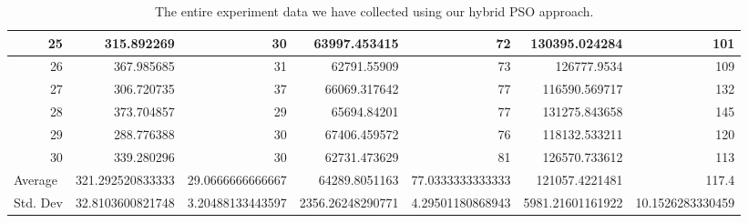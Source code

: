 \begin{table}
\begin{adjustwidth}{}{}
{{\begin{tabular}{|r|r|r|r|r|r|r|}
\hline
25                                         & 315.892269                   & 30                                    & 63997.453415                   & 72                                    & 130395.024284                & 101                                    \\ 
\hline
26                                         & 367.985685                   & 31                                    & 62791.55909                    & 73                                    & 126777.9534                  & 109                                    \\ 
\hline
27                                         & 306.720735                   & 37                                    & 66069.317642                   & 77                                    & 116590.569717                & 132                                    \\ 
\hline
28                                         & 373.704857                   & 29                                    & 65694.84201                    & 77                                    & 131275.843658                & 145                                    \\ 
\hline
29                                         & 288.776388                   & 30                                    & 67406.459572                   & 76                                    & 118132.533211                & 120                                    \\ 
\hline
30                                         & 339.280296                   & 30                                    & 62731.473629                   & 81                                    & 126570.733612                & 113                                    \\ 
\hline
\multicolumn{1}{|l|}{Average}              & 321.292520833333             & 29.0666666666667                      & 64289.8051163                  & 77.0333333333333                      & 121057.4221481               & 117.4                                  \\ 
\hline
\multicolumn{1}{|l|}{Std. Dev}             & 32.8103600821748             & 3.20488133443597                      & 2356.26248290771               & 4.29501180868943                      & 5981.21601161922             & 10.1526283330459                       \\
\hline
\end{tabular}}}
\end{adjustwidth}
\caption{The entire experiment data we have collected using our hybrid PSO approach.}
\label{full-data-pso}
\end{table}

